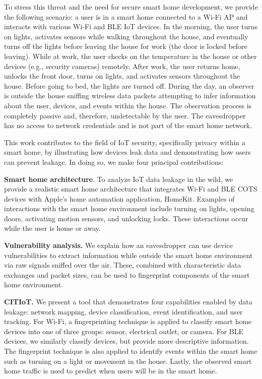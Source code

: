 \documentclass[12pt,letterpaper,oneside]{book}
\begin{document}
To stress this threat and the need for secure smart home development, we provide the following scenario: a user is in a smart home connected to a Wi-Fi \ac{AP} and interacts with various Wi-Fi and \ac{BLE} \ac{IoT} devices. In the morning, the user turns on lights, activates sensors while walking throughout the house, and eventually turns off the lights before leaving the house for work (the door is locked before leaving). While at work, the user checks on the temperature in the house or other devices (e.g., security cameras) remotely. After work, the user returns home, unlocks the front door, turns on lights, and activates sensors throughout the house. Before going to bed, the lights are turned off. During the day, an observer is outside the house sniffing wireless data packets attempting to infer information about the user, devices, and events within the house. The observation process is completely passive and, therefore, undetectable by the user. The eavesdropper has no access to  network credentials and is not part of the smart home network. 

This work contributes to the field of \ac{IoT} security, specifically privacy within a smart home, by illustrating how devices leak data and demonstrating how users can prevent leakage. In doing so, we make four principal contributions:

\textbf{Smart home architecture}. To analyze \ac{IoT} data leakage in the wild, we provide a realistic smart home architecture that integrates Wi-Fi and \ac{BLE} \ac{COTS} devices with Apple's home automation application, HomeKit. Examples of interactions with the smart home environment include turning on lights, opening doors, activating motion sensors, and unlocking locks. These interactions occur while the user is home or away.

\textbf{Vulnerability analysis.} We explain how an eavesdropper can use device vulnerabilities to extract information while outside the smart home environment via raw signals sniffed over the air.  These, combined with characteristic data exchanges and packet sizes, can be used to fingerprint components of the smart home environment.

\textbf{\ac{CITIoT}.} We present a tool that demonstrates four capabilities enabled by data leakage: network mapping, device classification, event identification, and user tracking. For Wi-Fi, a fingerprinting technique is applied to classify smart home devices into one of three groups: sensor, electrical outlet, or camera. For \ac{BLE} devices, we similarly classify devices, but provide more descriptive information. The fingerprint technique is also applied to identify events within the smart home such as turning on a light or movement in the house. Lastly, the observed smart home traffic is used to predict when users will be in the smart home.
\end{document}
